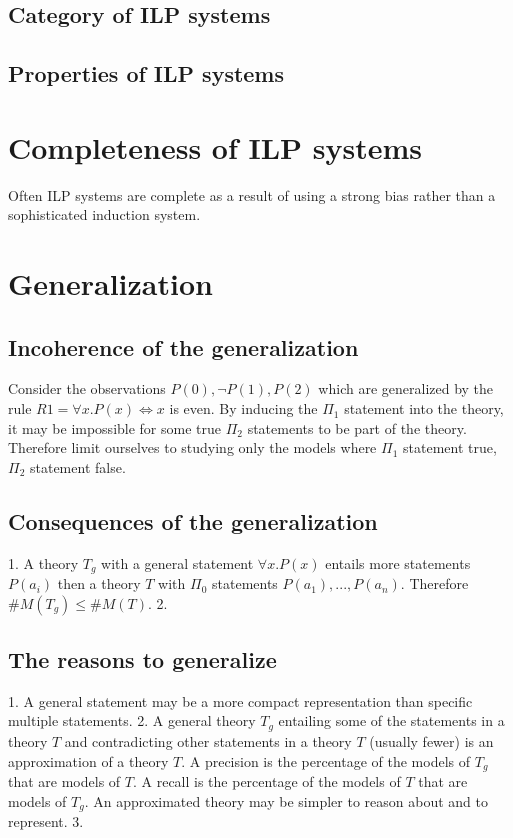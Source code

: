 \subsection{Category of ILP systems}

\subsection{Properties of ILP systems}

\subsection{}
\subsection{}
\section{Completeness of ILP systems}
Often ILP systems are complete as a result of using a strong bias rather than a sophisticated induction system.
\section{Generalization}
\subsection{Incoherence of the generalization}
Consider the observations $P(0), \neg P(1), P(2)$ which are generalized by the rule $R1=\forall x. P(x) \iff x$ is even. By inducing the $\Pi_1$ statement into the theory, it may be impossible for some true $\Pi_2$ statements to be part of the theory. Therefore limit ourselves to studying only the models where $\Pi_1$ statement true, $\Pi_2$ statement false.
\subsection{Consequences of the generalization}
1. A theory $T_g$ with a general statement $\forall x.P(x)$ entails more statements $P(a_i)$ then a theory $T$ with $\Pi_0$ statements $P(a_1), ..., P(a_n)$. Therefore $\#M(T_g) \leq \#M(T)$.
2. 
\subsection{The reasons to generalize}
1. A general statement may be a more compact representation than specific multiple statements.
2. A general theory $T_g$ entailing some of the statements in a theory $T$ and contradicting other statements in a theory $T$ (usually fewer) is an approximation of a theory $T$. A precision is the percentage of the models of $T_g$ that are models of $T$. A recall is the percentage of the models of $T$ that are models of $T_g$. An approximated theory may be simpler to reason about and to represent.
3. 

